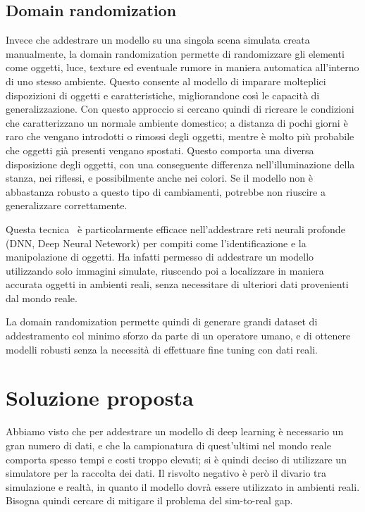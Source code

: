 \documentclass[12pt]{report}
\begin{document}
\section{Domain randomization}
\label{sec:randomization}

Invece che addestrare un modello su una singola scena simulata creata manualmente, la domain randomization permette di randomizzare gli elementi come oggetti, luce, texture ed eventuale rumore in maniera automatica all'interno di uno stesso ambiente. Questo consente al modello di imparare molteplici dispozizioni di oggetti e caratteristiche, migliorandone così le capacità di generalizzazione. Con questo approccio si cercano quindi di ricreare le condizioni che caratterizzano un normale ambiente domestico; a distanza di pochi giorni è raro che vengano introdotti o rimossi degli oggetti, mentre è molto più probabile che oggetti già presenti vengano spostati. Questo comporta una diversa disposizione degli oggetti, con una conseguente differenza nell'illuminazione della stanza, nei riflessi, e possibilmente anche nei colori. Se il modello non è abbastanza robusto a questo tipo di cambiamenti, potrebbe non riuscire a generalizzare correttamente.

Questa tecnica~\cite{8202133} è particolarmente efficace nell'addestrare reti neurali profonde (DNN, Deep Neural Netework) per compiti come l'identificazione e la manipolazione di oggetti. Ha infatti permesso di addestrare un modello utilizzando solo immagini simulate, riuscendo poi a localizzare in maniera accurata oggetti in ambienti reali, senza necessitare di ulteriori dati provenienti dal mondo reale.

La domain randomization permette quindi di generare grandi dataset di addestramento col minimo sforzo da parte di un operatore umano, e di ottenere modelli robusti senza la necessità di effettuare fine tuning con dati reali.

\chapter{Soluzione proposta}
\label{chap:soluzione}

Abbiamo visto che per addestrare un modello di deep learning è necessario un gran numero di dati, e che la campionatura di quest'ultimi nel mondo reale comporta spesso tempi e costi troppo elevati; si è quindi deciso di utilizzare un simulatore per la raccolta dei dati. Il risvolto negativo è però il divario tra simulazione e realtà, in quanto il modello dovrà essere utilizzato in ambienti reali. Bisogna quindi cercare di mitigare il problema del sim-to-real gap.
\end{document}
